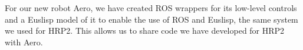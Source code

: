 \documentclass{standalone}
\begin{document}
For our new robot Aero, we have created ROS wrappers for its low-level controls and a Euslisp model of it to enable the use of ROS and Euslisp, the same system we used for HRP2. This allows us to share code we have developed for HRP2 with Aero. 
\end{document}
